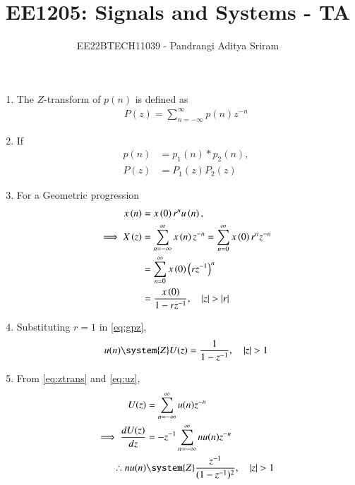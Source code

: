 \documentclass[journal,12pt,onecolumn]{IEEEtran}
\theoremstyle{remark}
\begin{document}

\vspace{3cm}

\title{EE1205: Signals and Systems - TA}
\author{EE22BTECH11039 - Pandrangi Aditya Sriram}
\maketitle

\renewcommand{\thefigure}{\theenumi}
\renewcommand{\thetable}{\theenumi}

\begin{enumerate}[label=\thechapter.\arabic*,ref=\thechapter.\theenumi]
\item 
	The $Z$-transform of $p(n)$ is defined as
\begin{align}
P(z) = \sum_{n=-\infty}^{\infty}p(n)z^{-n}
\label{eq:ztrans}
\end{align}
\item If 
\begin{align}
	p(n) &= p_1(n)* p_2(n),
	\\
	P(z)&=P_1(z)P_2(z)
\label{eq:prodz}
\end{align}
\item For a Geometric progression 
\begin{align}
	       \label{eq:gpn}
	x\left(n\right) &=x\left(0\right)r^nu\left(n\right),
	\\
         \implies      X\left(z\right) &= \sum_{n=-\infty}^{\infty}x\left(n\right)z^{-n}
               =\sum_{n=0}^{\infty}x\left(0\right)r^nz^{-n}\\
                &=\sum_{n=0}^{\infty}x\left(0\right)\left(rz^{-1}\right)^n\\
               &= \frac{x\left(0\right)}{1-rz^{-1}}, \quad \left\vert z\right\vert>\left\vert r\right\vert 
	       \label{eq:gpz}
\end{align}
\item 	       Substituting $r = 1$ in \eqref{eq:gpz},
\begin{align}
	u(n) \system{Z}	U(z) = 
                \frac{1}{1-z^{-1}}, \quad \abs{z}>1
	       \label{eq:uz}
\end{align}
\item From 
\eqref{eq:ztrans}
	       and 
	       \eqref{eq:uz},
\begin{align}
	U(z) &= \sum_{n = -\infty}^{\infty} u(n) z^{-n} 
	\\
\implies	\frac{dU(z)}{dz} &= -{z}^{-1} \sum_{n = -\infty}^{\infty} nu(n) z^{-n}\\
\therefore	nu(n) &\system{Z}\frac{z^{-1}}{(1-z^{-1})^{2}}, \quad \abs{z} > 1 

\end{align}
\end{enumerate}
\end{document}

